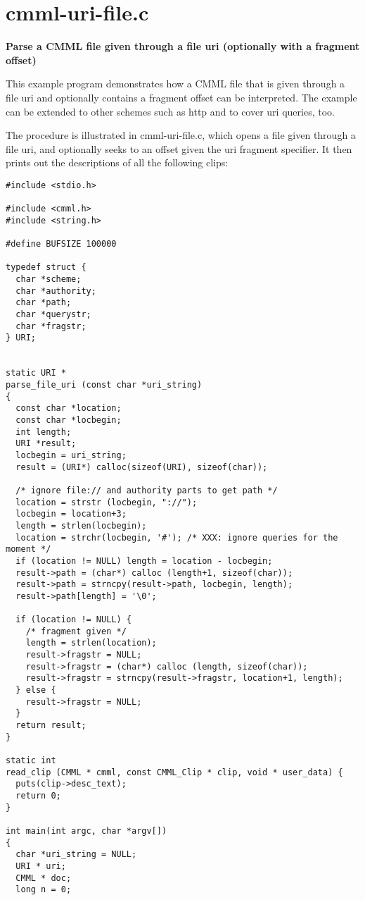 \section{cmml-uri-file.c}
{\bf Parse a CMML file given through a file uri (optionally with a fragment offset)}

This example program demonstrates how a CMML file that is given through a file uri and optionally contains a fragment offset can be interpreted. The example can be extended to other schemes such as http and to cover uri queries, too.

The procedure is illustrated in cmml-uri-file.c, which opens a file given through a file uri, and optionally seeks to an offset given the uri fragment specifier. It then prints out the descriptions of all the following clips: 

\footnotesize\begin{verbatim}
#include <stdio.h>

#include <cmml.h>
#include <string.h>

#define BUFSIZE 100000

typedef struct {
  char *scheme;    
  char *authority; 
  char *path;      
  char *querystr;  
  char *fragstr;   
} URI;
 

static URI *
parse_file_uri (const char *uri_string)
{
  const char *location;
  const char *locbegin;
  int length;
  URI *result;
  locbegin = uri_string;
  result = (URI*) calloc(sizeof(URI), sizeof(char));

  /* ignore file:// and authority parts to get path */
  location = strstr (locbegin, "://");
  locbegin = location+3;
  length = strlen(locbegin);
  location = strchr(locbegin, '#'); /* XXX: ignore queries for the moment */
  if (location != NULL) length = location - locbegin;
  result->path = (char*) calloc (length+1, sizeof(char));
  result->path = strncpy(result->path, locbegin, length);
  result->path[length] = '\0';

  if (location != NULL) { 
    /* fragment given */
    length = strlen(location);
    result->fragstr = NULL;
    result->fragstr = (char*) calloc (length, sizeof(char));
    result->fragstr = strncpy(result->fragstr, location+1, length);
  } else {
    result->fragstr = NULL;
  }
  return result;
}

static int
read_clip (CMML * cmml, const CMML_Clip * clip, void * user_data) {
  puts(clip->desc_text);
  return 0;
}

int main(int argc, char *argv[])
{
  char *uri_string = NULL;
  URI * uri;
  CMML * doc;
  long n = 0;


\end{verbatim}

